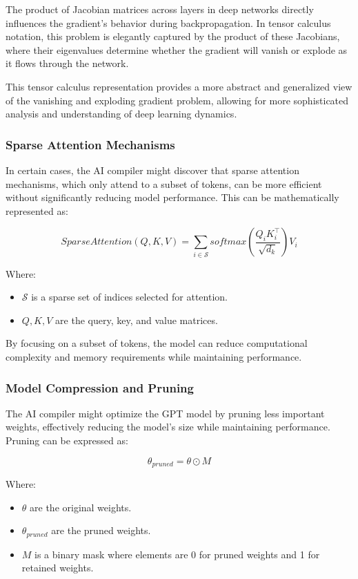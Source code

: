 \documentclass{article}
\begin{document}
The product of Jacobian matrices across layers in deep networks directly influences the gradient's behavior during backpropagation. In tensor calculus notation, this problem is elegantly captured by the product of these Jacobians, where their eigenvalues determine whether the gradient will vanish or explode as it flows through the network.

This tensor calculus representation provides a more abstract and generalized view of the vanishing and exploding gradient problem, allowing for more sophisticated analysis and understanding of deep learning dynamics.


\subsubsection{Sparse Attention Mechanisms}

In certain cases, the AI compiler might discover that sparse attention mechanisms, which only attend to a subset of tokens, can be more efficient without significantly reducing model performance. This can be mathematically represented as:

\[ \textit{SparseAttention}(Q, K, V) = \sum_{i \in \mathcal{S}} \textit{softmax}\left(\frac{Q_iK_i^\top}{\sqrt{d_k}}\right)V_i \]

Where:
\begin{itemize}
    \item \( \mathcal{S} \) is a sparse set of indices selected for attention.
    \item \( Q, K, V \) are the query, key, and value matrices.
\end{itemize}

By focusing on a subset of tokens, the model can reduce computational complexity and memory requirements while maintaining performance.

\subsubsection{Model Compression and Pruning}

The AI compiler might optimize the GPT model by pruning less important weights, effectively reducing the model's size while maintaining performance. Pruning can be expressed as:

\[ \theta_{pruned} = \theta \odot M \]

Where:
\begin{itemize}
    \item \( \theta \) are the original weights.
    \item \( \theta_{pruned} \) are the pruned weights.
    \item \( M \) is a binary mask where elements are 0 for pruned weights and 1 for retained weights.
\end{itemize}
\end{document}
